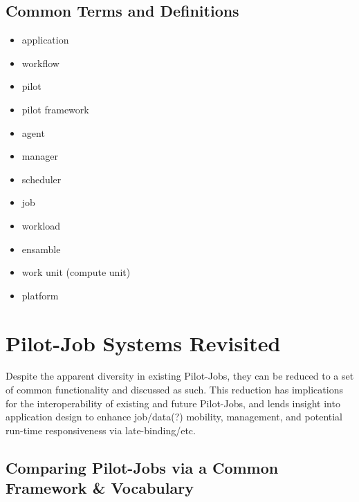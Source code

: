 \documentclass{sig-alternate}
\begin{document}
\subsection{Common Terms and Definitions}

\begin{itemize}
	\item application
	\item workflow
        \item pilot
        \item pilot framework
        \item agent
	\item manager
        \item scheduler
	\item job
        \item workload
	\item ensamble
        \item work unit (compute unit)
	\item platform
\end{itemize}

\section{Pilot-Job Systems Revisited}
Despite the apparent diversity in existing Pilot-Jobs,
they can be reduced to a set of common functionality and
discussed as such.  This reduction has implications
for the interoperability of existing and future Pilot-Jobs, and
lends insight into application design to enhance job/data(?)
mobility, management, and potential run-time responsiveness via
late-binding/etc.
\subsection{Comparing Pilot-Jobs via a Common Framework \& Vocabulary}
\end{document}
